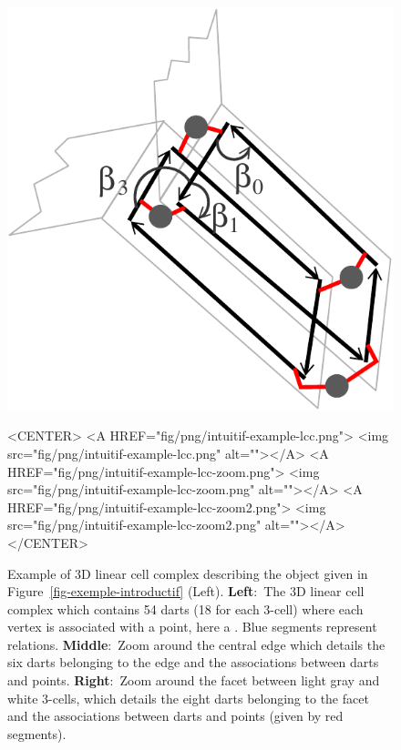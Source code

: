 \begin{figure}[h]
\begin{ccTexOnly}
\begin{center}
      \includegraphics[width=\LargFig]{Linear_cell_complex/fig/pdf/intuitif-example-lcc-zoom2}
    \end{center}
  \end{ccTexOnly}
  \begin{ccHtmlOnly}
    <CENTER>
    <A HREF="fig/png/intuitif-example-lcc.png">
    <img src="fig/png/intuitif-example-lcc.png" alt=""></A>
    <A HREF="fig/png/intuitif-example-lcc-zoom.png">
        <img src="fig/png/intuitif-example-lcc-zoom.png" alt=""></A>
    <A HREF="fig/png/intuitif-example-lcc-zoom2.png">
        <img src="fig/png/intuitif-example-lcc-zoom2.png" alt=""></A>
    </CENTER>
    \end{ccHtmlOnly}
    \caption{Example of 3D linear cell complex describing the object
      given in Figure~\ref{fig-exemple-introductif} (Left).
      \textbf{Left}:~The 3D linear cell complex which contains 54 darts
      (18 for each 3-cell) where each vertex is associated with a
      point, here a . Blue segments represent \betatrois{} relations.
      \textbf{Middle}:~Zoom around
      the central edge which details the six darts belonging to the
      edge and the associations between darts and points.
      \textbf{Right}:~Zoom around the facet between light gray and
      white 3-cells, which details the eight darts belonging to the
      facet and the associations between darts and
      points (given by red segments).\label{fig-exemple-introductif-lcc}}
\end{figure}

